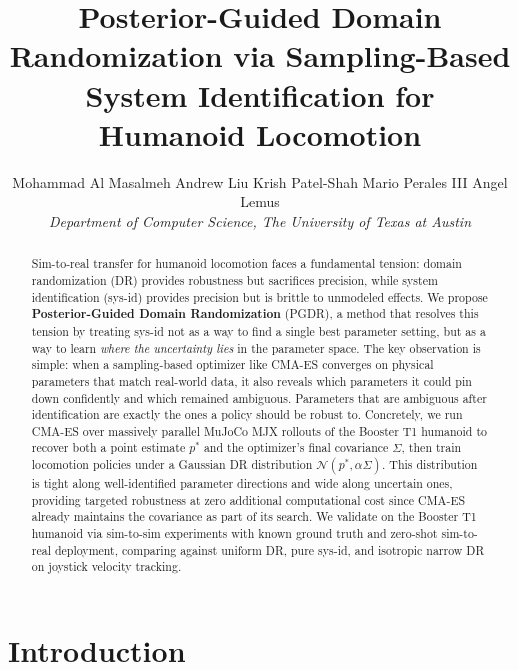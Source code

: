 \documentclass[10pt,twocolumn]{article}
\begin{document}
\title{\Large\bfseries Posterior-Guided Domain Randomization via Sampling-Based System Identification for Humanoid Locomotion}

\author{
{Mohammad Al Masalmeh \quad Andrew Liu \quad Krish Patel-Shah \quad Mario Perales III \quad Angel Lemus} \\
\textit{Department of Computer Science, The University of Texas at Austin}
}
\maketitle

\begin{abstract}
Sim-to-real transfer for humanoid locomotion faces a fundamental tension: domain randomization (DR) provides robustness but sacrifices precision, while system identification (sys-id) provides precision but is brittle to unmodeled effects.
We propose \textbf{Posterior-Guided Domain Randomization} (PGDR), a method that resolves this tension by treating sys-id not as a way to find a single best parameter setting, but as a way to learn \emph{where the uncertainty lies} in the parameter space.
The key observation is simple: when a sampling-based optimizer like CMA-ES converges on physical parameters that match real-world data, it also reveals which parameters it could pin down confidently and which remained ambiguous.
Parameters that are ambiguous after identification are exactly the ones a policy should be robust to.
Concretely, we run CMA-ES over massively parallel MuJoCo MJX rollouts of the Booster T1 humanoid to recover both a point estimate $p^*$ and the optimizer's final covariance $\Sigma$, then train locomotion policies under a Gaussian DR distribution $\mathcal{N}(p^*, \alpha\Sigma)$.
This distribution is tight along well-identified parameter directions and wide along uncertain ones, providing targeted robustness at zero additional computational cost since CMA-ES already maintains the covariance as part of its search.
We validate on the Booster T1 humanoid via sim-to-sim experiments with known ground truth and zero-shot sim-to-real deployment, comparing against uniform DR, pure sys-id, and isotropic narrow DR on joystick velocity tracking.
\end{abstract}

\section{Introduction}
\end{document}
